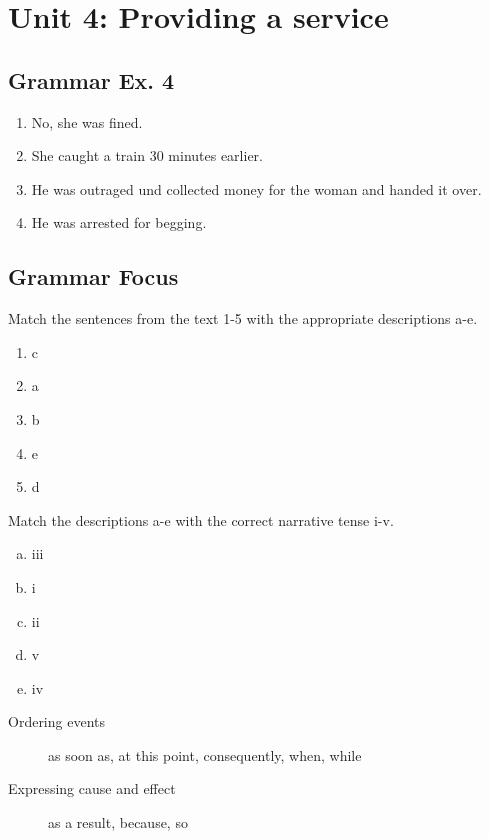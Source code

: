 \documentclass[12pt, a4paper, oneside]{article}
\begin{document}
  \section{Unit 4: Providing a service}
  \subsection{Grammar Ex. 4}
  \begin{enumerate}[1.]
    \item No, she was fined.
    \item She caught a train 30 minutes earlier.
    \item He was outraged und collected money for the woman and handed it over.
    \item He was arrested for begging.
  \end{enumerate}

  \subsection{Grammar Focus}
  Match the sentences from the text 1-5 with the appropriate descriptions a-e.
  \begin{enumerate}[1.]
    \item c
    \item a
    \item b
    \item e
    \item d
  \end{enumerate}
  
  Match the descriptions a-e with the correct narrative tense i-v.
  \begin{enumerate}[a.]
    \item iii
    \item i
    \item ii
    \item v
    \item iv
  \end{enumerate}

  \begin{description}
    \item[Ordering events] as soon as, at this point, consequently, when, while
    \item[Expressing cause and effect] as a result, because, so
  \end{description}
  
\end{document}

